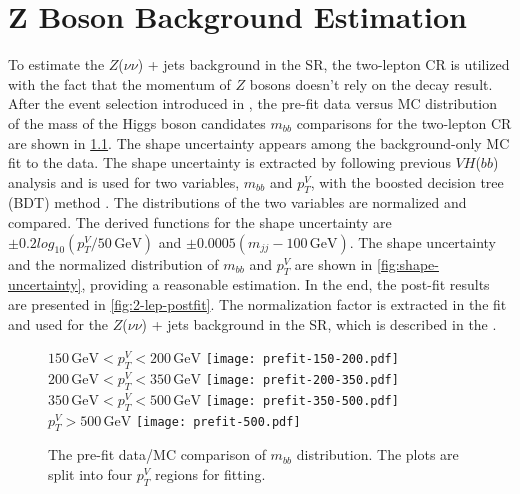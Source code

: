 \documentclass[class=NTHU_thesis, crop=false]{standalone}
\begin{document}
\chapter{Z Boson Background Estimation}
\label{chap:Z_bkg_estimation}
To estimate the $Z$($\nu\nu$) + jets background in the SR, the two-lepton CR is utilized with the fact that the momentum of $Z$ bosons doesn't rely on the decay result. After the event selection introduced in , the pre-fit data versus MC distribution of the mass of the Higgs boson candidates $m_{bb}$ comparisons for the two-lepton CR are shown in \cref{fig:2-lep-prefit}. The shape uncertainty appears among the background-only MC fit to the data. The shape uncertainty is extracted by following previous $VH$($bb$) analysis \cite{ATLAS-CONF-2018-036} and is used for two variables, $m_{bb}$ and $p^V_T$, with the boosted decision tree (BDT) method \cite{pmid28114007}. The distributions of the two variables are normalized and compared. The derived functions for the shape uncertainty are $\pm 0.2 log_{10} (p^V_T/50\, \mathrm{GeV})$ and $\pm 0.0005 (m_{jj} - 100\, \mathrm{GeV})$. The shape uncertainty and the normalized distribution of $m_{bb}$ and $p^V_T$ are shown in \cref{fig:shape-uncertainty}, providing a reasonable estimation. In the end, the post-fit results are presented in \cref{fig:2-lep-postfit}. The normalization factor is extracted in the fit and used for the $Z$($\nu\nu$) + jets background in the SR, which is described in the .

\begin{figure}[!hbt]
	\captionsetup[subfigure]{labelformat=empty}
	\centering
	\subcaptionbox
		{$150\, \mathrm{GeV} < p^V_T < 200\, \mathrm{GeV}$
		\label{fig:2-lep-prefit-fig1}}
		{\texttt{[image: prefit-150-200.pdf]}}
	\subcaptionbox
		{$200\, \mathrm{GeV} < p^V_T < 350\, \mathrm{GeV}$
		\label{fig:2-lep-prefit-fig2}}
		{\texttt{[image: prefit-200-350.pdf]}}
	\vspace{\baselineskip}
	\subcaptionbox
		{$350\, \mathrm{GeV} < p^V_T < 500\, \mathrm{GeV}$
		\label{fig:2-lep-prefit-fig3}}
		{\texttt{[image: prefit-350-500.pdf]}}
	\subcaptionbox
		{$p^V_T > 500\, \mathrm{GeV}$
		\label{fig:2-lep-prefit-fig4}}
		{\texttt{[image: prefit-500.pdf]}}
	\caption{The pre-fit data/MC comparison of $m_{bb}$ distribution. The plots are split into four $p^V_T$ regions for fitting.}
	\label{fig:2-lep-prefit}
\end{figure}
\end{document}
